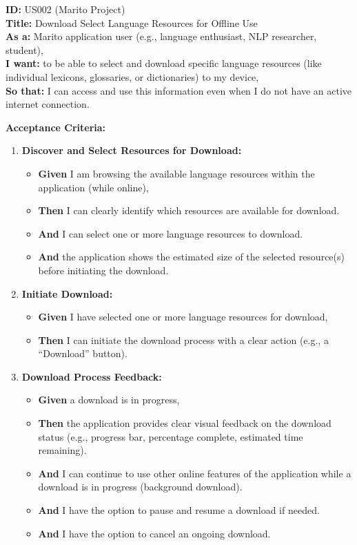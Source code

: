 \documentclass[12pt]{article}
\begin{document}
\textbf{ID:} US002 (Marito Project) \\
\textbf{Title:} Download Select Language Resources for Offline Use \\
\textbf{As a:} Marito application user (e.g., language enthusiast, NLP researcher, student), \\
\textbf{I want:} to be able to select and download specific language resources (like individual lexicons, glossaries, or dictionaries) to my device, \\
\textbf{So that:} I can access and use this information even when I do not have an active internet connection.

\vspace{1em}
\textbf{Acceptance Criteria:}
\begin{enumerate}
    \item \textbf{Discover and Select Resources for Download:}
    \begin{itemize}
        \item \textbf{Given} I am browsing the available language resources within the application (while online),
        \item \textbf{Then} I can clearly identify which resources are available for download.
        \item \textbf{And} I can select one or more language resources to download.
        \item \textbf{And} the application shows the estimated size of the selected resource(s) before initiating the download.
    \end{itemize}

    \item \textbf{Initiate Download:}
    \begin{itemize}
        \item \textbf{Given} I have selected one or more language resources for download,
        \item \textbf{Then} I can initiate the download process with a clear action (e.g., a ``Download'' button).
    \end{itemize}

    \item \textbf{Download Process Feedback:}
    \begin{itemize}
        \item \textbf{Given} a download is in progress,
        \item \textbf{Then} the application provides clear visual feedback on the download status (e.g., progress bar, percentage complete, estimated time remaining).
        \item \textbf{And} I can continue to use other online features of the application while a download is in progress (background download).
        \item \textbf{And} I have the option to pause and resume a download if needed.
        \item \textbf{And} I have the option to cancel an ongoing download.
    \end{itemize}


\end{enumerate}
\end{document}
